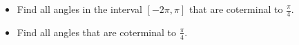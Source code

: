 \begin{frame}
\begin{example}
\begin{itemize}
\item Find all angles in the interval $[-2\pi, \pi]$ that are coterminal to $\frac{\pi}{4}$.
\item Find all angles that are coterminal to $\frac{\pi}{4}$.
\end{itemize}
\end{example}
\end{frame}